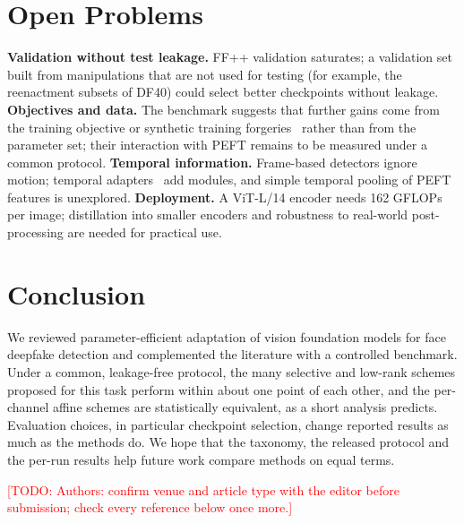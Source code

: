 \documentclass[fonts]{icst}
\newcommand{\todo}[1]{\textcolor{red}{[TODO: #1]}}
\begin{document}
\section{Open Problems}
\label{sec:open}
\textbf{Validation without test leakage.} FF++ validation saturates; a validation set built from manipulations that are not used for testing (for example, the reenactment subsets of DF40) could select better checkpoints without leakage.
\textbf{Objectives and data.} The benchmark suggests that further gains come from the training objective or synthetic training forgeries~\cite{shiohara2022sbi} rather than from the parameter set; their interaction with PEFT remains to be measured under a common protocol.
\textbf{Temporal information.} Frame-based detectors ignore motion; temporal adapters~\cite{han2024fcg} add modules, and simple temporal pooling of PEFT features is unexplored.
\textbf{Deployment.} A ViT-L/14 encoder needs 162 GFLOPs per image; distillation into smaller encoders and robustness to real-world post-processing are needed for practical use.

\section{Conclusion}
We reviewed parameter-efficient adaptation of vision foundation models for face deepfake detection and complemented the literature with a controlled benchmark. Under a common, leakage-free protocol, the many selective and low-rank schemes proposed for this task perform within about one point of each other, and the per-channel affine schemes are statistically equivalent, as a short analysis predicts. Evaluation choices, in particular checkpoint selection, change reported results as much as the methods do. We hope that the taxonomy, the released protocol and the per-run results help future work compare methods on equal terms.

\todo{Authors: confirm venue and article type with the editor before submission; check every reference below once more.}
\end{document}

